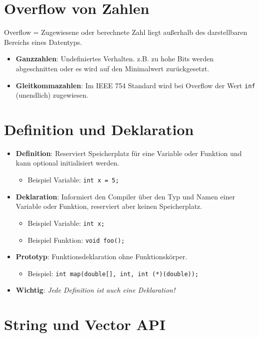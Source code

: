 \documentclass[10pt, a3paper, landscape]{article}
\newcommand{\algo}[1]{\textbf{\textcolor{blue!60!black}{#1}}}
\newcommand{\datastruct}[1]{\textbf{\textcolor{red!60!black}{#1}}}
\begin{document}
\begin{multicols*}{4}
\section{Overflow von Zahlen}
Overflow = Zugewiesene oder berechnete Zahl liegt außerhalb des darstellbaren Bereichs eines Datentyps.
\begin{itemize}
    \item \datastruct{Ganzzahlen}: Undefiniertes Verhalten. z.B. zu hohe Bits werden abgeschnitten oder es wird auf den Minimalwert zurückgesetzt.
    \item \datastruct{Gleitkommazahlen}: Im IEEE 754 Standard wird bei Overflow der Wert \texttt{inf} (unendlich) zugewiesen.
\end{itemize}

\section{Definition und Deklaration}
\begin{itemize}
    \item \algo{Definition}: Reserviert Speicherplatz für eine Variable oder Funktion und kann optional initialisiert werden.
    \begin{itemize}
        \item Beispiel Variable: \lstinline|int x = 5;|
    \end{itemize}
    \item \datastruct{Deklaration}: Informiert den Compiler über den Typ und Namen einer Variable oder Funktion, reserviert aber keinen Speicherplatz.
    \begin{itemize}
        \item Beispiel Variable: \lstinline|int x;|
        \item Beispiel Funktion: \lstinline|void foo();|
    \end{itemize}
    \item \datastruct{Prototyp}: Funktionsdeklaration ohne Funktionskörper.
    \begin{itemize}
        \item Beispiel: \lstinline|int map(double[], int, int (*)(double));|
    \end{itemize}
    \item \algo{Wichtig}: \textit{Jede Definition ist auch eine Deklaration!}
\end{itemize}

\section{String und Vector API}


\end{multicols*}
\end{document}
